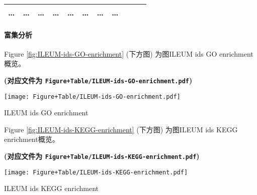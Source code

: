 \documentclass[
]{article}
\begin{document}
\begin{longtable}[]{@{}lllllllllll@{}}
\begin{minipage}[t]{0.09\columnwidth}
\ldots{}\strut
\end{minipage} & \begin{minipage}[t]{0.07\columnwidth}\raggedright
\ldots{}\strut
\end{minipage} & \begin{minipage}[t]{0.07\columnwidth}\raggedright
\ldots{}\strut
\end{minipage} & \begin{minipage}[t]{0.09\columnwidth}\raggedright
\ldots{}\strut
\end{minipage} & \begin{minipage}[t]{0.07\columnwidth}\raggedright
\ldots{}\strut
\end{minipage} & \begin{minipage}[t]{0.07\columnwidth}\raggedright
\ldots{}\strut
\end{minipage} & \begin{minipage}[t]{0.07\columnwidth}\raggedright
\ldots{}\strut
\end{minipage} & \begin{minipage}[t]{0.03\columnwidth}\raggedright
\ldots{}\strut
\end{minipage}\tabularnewline
\bottomrule
\end{longtable}

\hypertarget{en2}{%
\paragraph{富集分析}\label{en2}}

Figure \ref{fig:ILEUM-ids-GO-enrichment} (下方图) 为图ILEUM ids GO enrichment概览。

\textbf{(对应文件为 \texttt{Figure+Table/ILEUM-ids-GO-enrichment.pdf})}

\def\@captype{figure}
\begin{center}
\texttt{[image: Figure+Table/ILEUM-ids-GO-enrichment.pdf]}
\caption{ILEUM ids GO enrichment}\label{fig:ILEUM-ids-GO-enrichment}
\end{center}

Figure \ref{fig:ILEUM-ids-KEGG-enrichment} (下方图) 为图ILEUM ids KEGG enrichment概览。

\textbf{(对应文件为 \texttt{Figure+Table/ILEUM-ids-KEGG-enrichment.pdf})}

\def\@captype{figure}
\begin{center}
\texttt{[image: Figure+Table/ILEUM-ids-KEGG-enrichment.pdf]}
\caption{ILEUM ids KEGG enrichment}\label{fig:ILEUM-ids-KEGG-enrichment}
\end{center}
\end{document}
